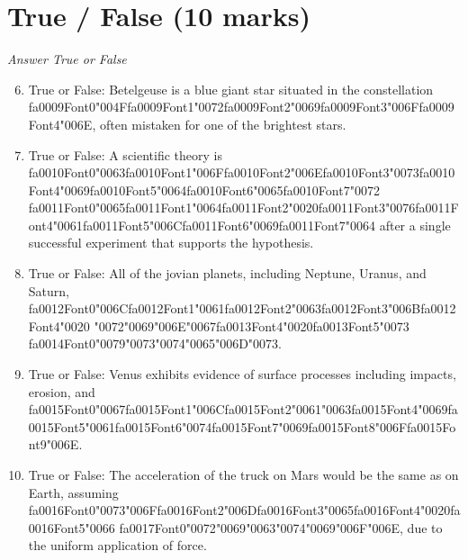 \documentclass[12pt]{article}
\begin{document}
\section*{True / False (10 marks)}
\textit{Answer True or False}
\begin{enumerate}[label=\arabic*.]
\setcounter{enumi}{5}
\item True or False: Betelgeuse is a blue giant star situated in the constellation {\csname fa0009Font0\endcsname\char"004F}{\csname fa0009Font1\endcsname\char"0072}{\csname fa0009Font2\endcsname\char"0069}{\csname fa0009Font3\endcsname\char"006F}{\csname fa0009Font4\endcsname\char"006E}, often mistaken for one of the brightest stars.
\item True or False: A scientific theory is {\csname fa0010Font0\endcsname\char"0063}{\csname fa0010Font1\endcsname\char"006F}{\csname fa0010Font2\endcsname\char"006E}{\csname fa0010Font3\endcsname\char"0073}{\csname fa0010Font4\endcsname\char"0069}{\csname fa0010Font5\endcsname\char"0064}{\csname fa0010Font6\endcsname\char"0065}{\csname fa0010Font7\endcsname\char"0072} {\csname fa0011Font0\endcsname\char"0065}{\csname fa0011Font1\endcsname\char"0064}{\csname fa0011Font2\endcsname\char"0020}{\csname fa0011Font3\endcsname\char"0076}{\csname fa0011Font4\endcsname\char"0061}{\csname fa0011Font5\endcsname\char"006C}{\csname fa0011Font6\endcsname\char"0069}{\csname fa0011Font7\endcsname\char"0064} after a single successful experiment that supports the hypothesis.
\item True or False: All of the jovian planets, including Neptune, Uranus, and Saturn, {\csname fa0012Font0\endcsname\char"006C}{\csname fa0012Font1\endcsname\char"0061}{\csname fa0012Font2\endcsname\char"0063}{\csname fa0012Font3\endcsname\char"006B}{\csname fa0012Font4\endcsname\char"0020} {\char"0072}{\char"0069}{\char"006E}{\char"0067}{\csname fa0013Font4\endcsname\char"0020}{\csname fa0013Font5\endcsname\char"0073} {\csname fa0014Font0\endcsname\char"0079}{\char"0073}{\char"0074}{\char"0065}{\char"006D}{\char"0073}.
\item True or False: Venus exhibits evidence of surface processes including impacts, erosion, and {\csname fa0015Font0\endcsname\char"0067}{\csname fa0015Font1\endcsname\char"006C}{\csname fa0015Font2\endcsname\char"0061}{\char"0063}{\csname fa0015Font4\endcsname\char"0069}{\csname fa0015Font5\endcsname\char"0061}{\csname fa0015Font6\endcsname\char"0074}{\csname fa0015Font7\endcsname\char"0069}{\csname fa0015Font8\endcsname\char"006F}{\csname fa0015Font9\endcsname\char"006E}.
\item True or False: The acceleration of the truck on Mars would be the same as on Earth, assuming {\csname fa0016Font0\endcsname\char"0073}{\char"006F}{\csname fa0016Font2\endcsname\char"006D}{\csname fa0016Font3\endcsname\char"0065}{\csname fa0016Font4\endcsname\char"0020}{\csname fa0016Font5\endcsname\char"0066} {\csname fa0017Font0\endcsname\char"0072}{\char"0069}{\char"0063}{\char"0074}{\char"0069}{\char"006F}{\char"006E}, due to the uniform application of force.
\end{enumerate}
\end{document}
